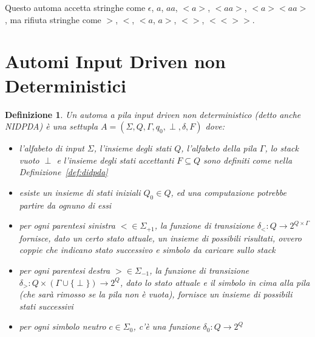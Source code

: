 \documentclass[a4paper,12pt]{report}
\newtheorem{definition}{Definizione}[chapter]
\theoremstyle{propositionstyle}
\begin{document}
    Questo automa accetta stringhe come $\epsilon$, $a$, $aa$, $<a>$, $<aa>$, $<a><aa>$, ma rifiuta stringhe come $>$, $<$, $<a$, $a>$, $<>$, $<<>>$.

    \section{Automi Input Driven non Deterministici}

    \begin{definition}
        Un \textit{automa a pila input driven non deterministico} (detto anche NIDPDA) è una settupla $A = \left(\Sigma, Q, \Gamma, q_0, \perp, \delta, F\right)$ dove:
        \begin{itemize}
            \item l'alfabeto di input $\Sigma$, l'insieme degli stati $Q$, l'alfabeto della pila $\Gamma$, lo stack vuoto $\perp$ e l'insieme degli stati accettanti $F \subseteq Q$ sono definiti come nella Definizione~\ref{def:didpda}
            \item esiste un insieme di stati iniziali $Q_0 \in Q$, ed una computazione potrebbe partire da ognuno di essi
            \item per ogni parentesi sinistra $< \in \Sigma_{+1}$, la funzione di transizione $\delta_{<} : Q \rightarrow 2^{Q \times \Gamma}$ fornisce, dato un certo stato attuale, un insieme di possibili risultati, ovvero coppie che indicano stato successivo e simbolo da caricare sullo stack
            \item per ogni parentesi destra $> \in \Sigma_{-1}$, la funzione di transizione $\delta_{>} : Q \times \left(\Gamma \cup \{\perp\}\right) \rightarrow 2^Q$, dato lo stato attuale e il simbolo in cima alla pila (che sarà rimosso se la pila non è vuota), fornisce un insieme di possibili stati successivi
            \item per ogni simbolo neutro $c \in \Sigma_{0}$, c'è una funzione $\delta_{0} : Q \rightarrow 2^Q$
        \end{itemize}
    \end{definition}
\end{document}
